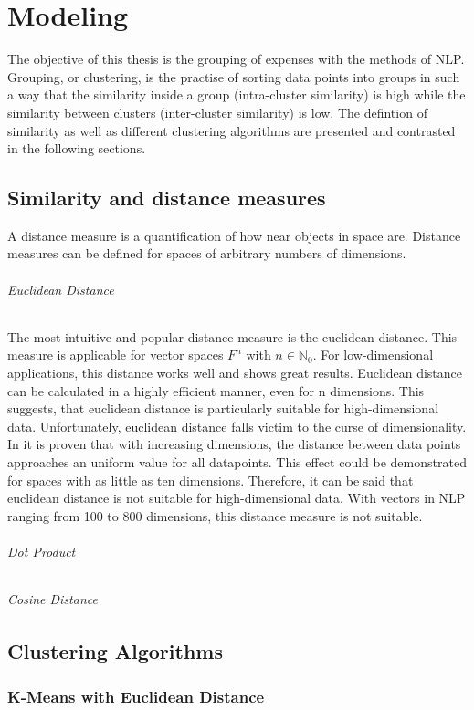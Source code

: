 \chapter{Modeling}
The objective of this thesis is the grouping of expenses with the methods of \ac{NLP}. Grouping, or clustering, is the practise of sorting data points into groups in such a way that the similarity inside a group (intra-cluster similarity) is high while the similarity between clusters (inter-cluster similarity) is low. The defintion of similarity as well as different clustering algorithms are presented and contrasted in the following sections.

\section{Similarity and distance measures}
A distance measure is a quantification of how near objects in space are. Distance measures can be defined for spaces of arbitrary numbers of dimensions. 

		\subparagraph{Euclidean Distance} \label{euclidean}
		The most intuitive and popular distance measure is the euclidean distance. This measure is applicable for vector spaces $F^{n}$ with $n \in \mathbb{N}_0 $. For low-dimensional applications, this distance works well and shows great results. Euclidean distance can be calculated in a highly efficient manner, even for n dimensions. This suggests, that euclidean distance is particularly suitable for high-dimensional data. Unfortunately, euclidean distance falls victim to the curse of dimensionality. In \cite[p.~1]{beyerNearestNeighbor} it is proven that with increasing dimensions, the distance between data points approaches an uniform value for all datapoints. This effect could be demonstrated for spaces with as little as ten dimensions. Therefore, it can be said that euclidean distance is not suitable for high-dimensional data. With vectors in \ac{NLP} ranging from 100 to 800 dimensions, this distance measure is not suitable.
		
		\subparagraph{Dot Product}
		
		
		\subparagraph{Cosine Distance}
		
\section{Clustering Algorithms}
		
		\subsection{K-Means with Euclidean Distance}
